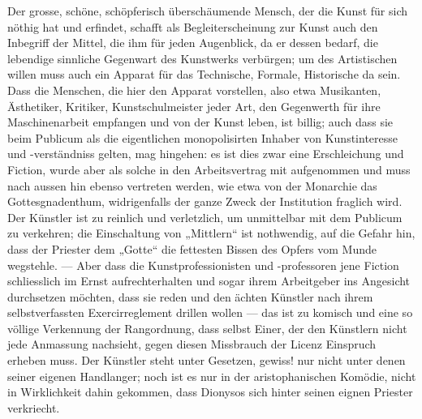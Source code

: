 Der grosse, schöne, schöpferisch überschäumende Mensch, der die Kunst für sich nöthig hat und erfindet, schafft als Begleiterscheinung zur Kunst auch den Inbegriff der Mittel, die ihm für jeden Augenblick, da er dessen bedarf, die lebendige sinnliche Gegenwart des Kunstwerks verbürgen; um des Artistischen willen muss auch ein Apparat für das Technische, Formale, Historische da sein. Dass die Menschen, die hier den Apparat vorstellen, also etwa Musikanten, Ästhetiker, Kritiker, Kunstschulmeister jeder Art, den Gegenwerth für ihre Maschinenarbeit empfangen und von der Kunst leben, ist billig; auch dass sie beim Publicum als die eigentlichen monopolisirten Inhaber von Kunstinteresse und -verständniss gelten, mag hingehen: es ist dies zwar eine Erschleichung und Fiction, wurde aber als solche in den Arbeitsvertrag mit aufgenommen und muss nach aussen hin ebenso vertreten werden, wie etwa von der Monarchie das Gottesgnadenthum, widrigenfalls der ganze Zweck der Institution fraglich wird. Der Künstler ist zu reinlich und verletzlich, um unmittelbar mit dem Publicum zu verkehren; die Einschaltung von „Mittlern“ ist nothwendig, auf die Gefahr hin, dass der Priester dem „Gotte“ die fettesten Bissen des Opfers vom Munde wegstehle. — Aber dass die Kunstprofessionisten und -professoren jene Fiction schliesslich im Ernst aufrechterhalten und sogar ihrem Arbeitgeber ins Angesicht durchsetzen möchten, dass sie  reden und den ächten Künstler nach ihrem selbstverfassten Exercirreglement drillen wollen — das ist zu komisch und eine so völlige Verkennung der Rangordnung, dass selbst Einer, der den Künstlern nicht jede Anmassung nachsieht, gegen diesen Missbrauch der Licenz Einspruch erheben muss. Der Künstler steht unter Gesetzen, gewiss! nur nicht unter denen seiner eigenen Handlanger; noch ist es nur in der aristophanischen Komödie, nicht in Wirklichkeit dahin gekommen, dass Dionysos sich hinter seinen eignen Priester verkriecht.
\par

